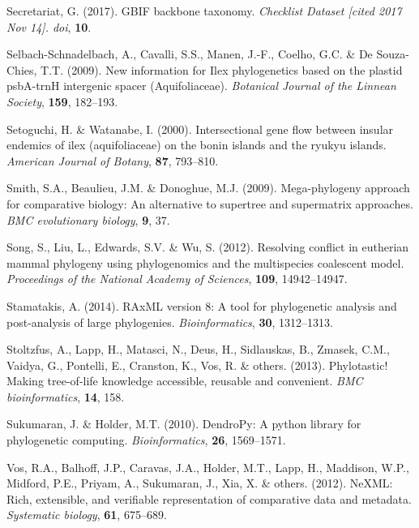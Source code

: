 \documentclass[]{article}
\begin{document}
\leavevmode\hypertarget{ref-secretariat2017gbif}{}%
Secretariat, G. (2017). GBIF backbone taxonomy. \emph{Checklist Dataset {[}cited 2017 Nov 14{]}. doi}, \textbf{10}.

\leavevmode\hypertarget{ref-selbach2009new}{}%
Selbach-Schnadelbach, A., Cavalli, S.S., Manen, J.-F., Coelho, G.C. \& De Souza-Chies, T.T. (2009). New information for Ilex phylogenetics based on the plastid psbA-trnH intergenic spacer (Aquifoliaceae). \emph{Botanical Journal of the Linnean Society}, \textbf{159}, 182--193.

\leavevmode\hypertarget{ref-setoguchi2000intersectional}{}%
Setoguchi, H. \& Watanabe, I. (2000). Intersectional gene flow between insular endemics of ilex (aquifoliaceae) on the bonin islands and the ryukyu islands. \emph{American Journal of Botany}, \textbf{87}, 793--810.

\leavevmode\hypertarget{ref-smith2009mega}{}%
Smith, S.A., Beaulieu, J.M. \& Donoghue, M.J. (2009). Mega-phylogeny approach for comparative biology: An alternative to supertree and supermatrix approaches. \emph{BMC evolutionary biology}, \textbf{9}, 37.

\leavevmode\hypertarget{ref-song2012resolving}{}%
Song, S., Liu, L., Edwards, S.V. \& Wu, S. (2012). Resolving conflict in eutherian mammal phylogeny using phylogenomics and the multispecies coalescent model. \emph{Proceedings of the National Academy of Sciences}, \textbf{109}, 14942--14947.

\leavevmode\hypertarget{ref-stamatakis2014raxml}{}%
Stamatakis, A. (2014). RAxML version 8: A tool for phylogenetic analysis and post-analysis of large phylogenies. \emph{Bioinformatics}, \textbf{30}, 1312--1313.

\leavevmode\hypertarget{ref-stoltzfus2013phylotastic}{}%
Stoltzfus, A., Lapp, H., Matasci, N., Deus, H., Sidlauskas, B., Zmasek, C.M., Vaidya, G., Pontelli, E., Cranston, K., Vos, R. \& others. (2013). Phylotastic! Making tree-of-life knowledge accessible, reusable and convenient. \emph{BMC bioinformatics}, \textbf{14}, 158.

\leavevmode\hypertarget{ref-sukumaran2010dendropy}{}%
Sukumaran, J. \& Holder, M.T. (2010). DendroPy: A python library for phylogenetic computing. \emph{Bioinformatics}, \textbf{26}, 1569--1571.

\leavevmode\hypertarget{ref-vos2012nexml}{}%
Vos, R.A., Balhoff, J.P., Caravas, J.A., Holder, M.T., Lapp, H., Maddison, W.P., Midford, P.E., Priyam, A., Sukumaran, J., Xia, X. \& others. (2012). NeXML: Rich, extensible, and verifiable representation of comparative data and metadata. \emph{Systematic biology}, \textbf{61}, 675--689.
\end{document}
